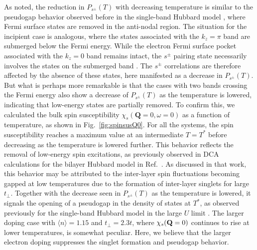 \documentclass[prb,twocolumn,amsmath,amssymb,superscriptaddress,floatfix,nofootinbib]{revtex4-2}
\begin{document}
As noted, the reduction in $P_{s^\pm}(T)$ with decreasing temperature is similar to the pseudogap behavior observed before in the single-band Hubbard model \cite{Maier2016}, where Fermi surface states are removed in the anti-nodal region. The situation for the incipient case is analogous, where the states associated with the $k_z = \pi$ band are submerged below the Fermi energy. While the electron Fermi surface pocket associated with the $k_z = 0$ band remains intact, the $s^\pm$ pairing state necessarily involves the states on the submerged band \cite{Maier2019}. The $s^\pm$ correlations are therefore affected by the absence of these states, here manifested as a decrease in $P_{s^\pm}(T)$. But what is perhaps more remarkable is that the cases with two bands crossing the Fermi energy also show a decrease of $P_{s^\pm}(T)$ as the temperature is lowered, indicating that low-energy states are partially removed. To confirm this, we calculated the bulk spin susceptibility $\chi_s(\mathbf{Q}=0, \omega=0)$ as a function of temperature, as shown in Fig.~\ref{fig:spinsusQ0}. For all the systems, the spin susceptibility reaches a maximum value at an intermediate $T = T^*$ before decreasing as the temperature is lowered further. This behavior reflects the removal of low-energy spin excitations, as previously observed in DCA calculations for the bilayer Hubbard model in Ref.~. As discussed in that work, this behavior may be attributed to the inter-layer spin fluctuations becoming gapped at low temperatures due to the formation of inter-layer singlets for large $t_\perp$. Together with the decrease seen in $P_{s^\pm}(T)$ as the temperature is lowered, it signals the opening of a pseudogap in the density of states at $T^*$, as observed previously for the single-band Hubbard model in the large $U$ limit \cite{Maier2016, Maier2019_2}. The larger doping case with $\langle n\rangle=1.15$ and $t_\perp=2.3t$, where $\chi_{s}({\bf Q}=0)$ continues to rise at lower temperatures, is somewhat peculiar. Here, we believe that the larger electron doping suppresses the singlet formation and pseudogap behavior. 
\end{document}
